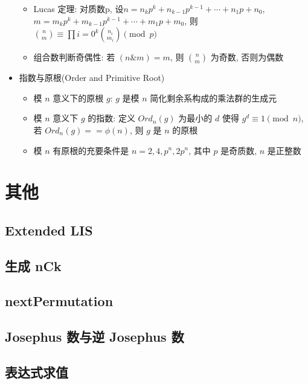 \documentclass[landscape, twocolumn, 8pt, a4paper, twoside]{extarticle}
\begin{document}
\begin{itemize}
    \begin{itemize}
    \item Lucas 定理:
      对质数p,
      设$n = n_k p^k + n_{k - 1} p ^ {k - 1} + \cdots + n_1 p + n_0$,
      $m = m_k p^k + m_{k - 1} p ^ {k - 1} + \cdots + m_1 p + m_0$,
      则 $ \binom{n}{m} \equiv \prod{i = 0}^{k}\binom{n_i}{m_i} \pmod{p}$
    \item 组合数判断奇偶性:
      若 $(n \& m) = m$, 则 $\binom{n}{m}$ 为奇数, 否则为偶数
    \end{itemize}
  \item{指数与原根(Order and Primitive Root)}
    \begin{itemize}
  \item 模 $n$ 意义下的原根 $g$: $g$ 是模 $n$ 简化剩余系构成的乘法群的生成元
  \item 模 $n$ 意义下 $g$ 的指数: 定义 $Ord_n(g)$ 为最小的 $d$ 使得 $g^d \equiv 1 \pmod{n}$, 若 $Ord_n(g) == \phi(n)$, 则 $g$ 是 $n$ 的原根
  \item 模 $n$ 有原根的充要条件是 $n = 2, 4, p^n, 2p^n$, 其中 $p$ 是奇质数, $n$ 是正整数
  
  \end{itemize}
  \end{itemize}
  
\section{其他}
  \subsection{Extended LIS}
    

  \subsection{生成 nCk}
    

  \subsection{nextPermutation}
    

  \subsection{Josephus 数与逆 Josephus 数}
    
  
  \subsection{表达式求值}
    
\end{document}

